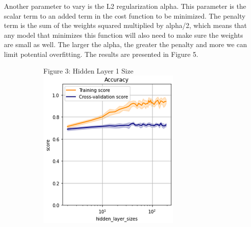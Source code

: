 \documentclass{article}
\begin{document}
Another parameter to vary is the L2 regularization alpha. This parameter is the scalar term to an added term in the cost function to be minimized. The penalty term is the sum of the weights squared multiplied by alpha/2, which means that any model that minimizes this function will also need to make sure the weights are small as well. The larger the alpha, the greater the penalty and more we can limit potential overfitting. The results are presented in Figure 5. 
\begin{figure}
	\centering
	\begin{subfigure}{.3\textwidth}
		\centering
		Figure 3: Hidden Layer 1 Size\\
		\includegraphics[width=\linewidth]{poland_nn_hidden_layer_size_2_200_accuracy.png}
		

\end{subfigure}
\end{figure}
\end{document}
